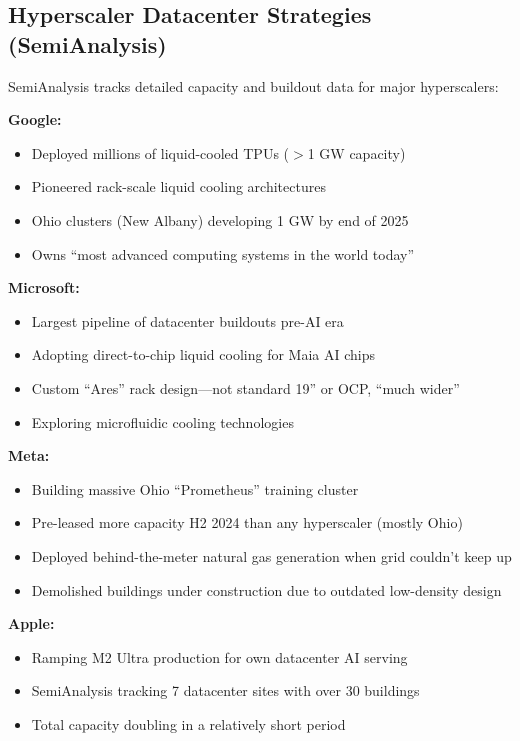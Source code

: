 \documentclass[11pt,a4paper]{article}
\begin{document}
\subsection{Hyperscaler Datacenter Strategies (SemiAnalysis)}

SemiAnalysis tracks detailed capacity and buildout data for major hyperscalers:

\textbf{Google:}
\begin{itemize}[leftmargin=*, itemsep=2pt]
    \item Deployed millions of liquid-cooled TPUs ($>$1 GW capacity)
    \item Pioneered rack-scale liquid cooling architectures
    \item Ohio clusters (New Albany) developing 1 GW by end of 2025
    \item Owns ``most advanced computing systems in the world today''
\end{itemize}

\textbf{Microsoft:}
\begin{itemize}[leftmargin=*, itemsep=2pt]
    \item Largest pipeline of datacenter buildouts pre-AI era
    \item Adopting direct-to-chip liquid cooling for Maia AI chips
    \item Custom ``Ares'' rack design—not standard 19'' or OCP, ``much wider''
    \item Exploring microfluidic cooling technologies
\end{itemize}

\textbf{Meta:}
\begin{itemize}[leftmargin=*, itemsep=2pt]
    \item Building massive Ohio ``Prometheus'' training cluster
    \item Pre-leased more capacity H2 2024 than any hyperscaler (mostly Ohio)
    \item Deployed behind-the-meter natural gas generation when grid couldn't keep up
    \item Demolished buildings under construction due to outdated low-density design
\end{itemize}

\textbf{Apple:}
\begin{itemize}[leftmargin=*, itemsep=2pt]
    \item Ramping M2 Ultra production for own datacenter AI serving
    \item SemiAnalysis tracking 7 datacenter sites with over 30 buildings
    \item Total capacity doubling in a relatively short period
\end{itemize}
\end{document}
